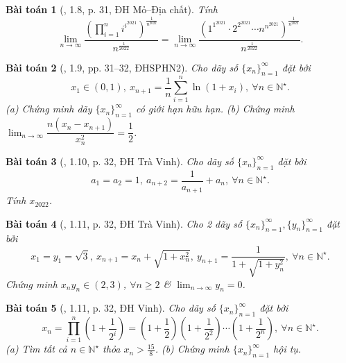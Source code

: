 \documentclass{article}
\newtheorem{baitoan}{Bài toán}
\begin{document}
\begin{baitoan}[\cite{VMS_VMC2023}, 1.8, p. 31, ĐH Mỏ--Địa chất]
	Tính
	\begin{equation*}
		\lim_{n\to\infty} \frac{\left(\prod_{i=1}^n i^{i^{2021}}\right)^{\frac{1}{n^{2022}}}}{n^{\frac{1}{2022}}} = \lim_{n\to\infty} \frac{\left(1^{1^{2021}}\cdot2^{2^{2021}}\cdots n^{n^{2021}}\right)^{\frac{1}{n^{2022}}}}{n^{\frac{1}{2022}}}.
	\end{equation*}
\end{baitoan}

\begin{baitoan}[\cite{VMS_VMC2023}, 1.9, pp. 31--32, ĐHSPHN2]
	Cho dãy số $\{x_n\}_{n=1}^\infty$ đặt bởi
	\begin{equation*}
		x_1\in(0,1),\ x_{n+1} = \frac{1}{n}\sum_{i=1}^n \ln(1 + x_i),\ \forall n\in\mathbb{N}^\star.
	\end{equation*}
	(a) Chứng minh dãy $\{x_n\}_{n=1}^\infty$ có giới hạn hữu hạn. (b) Chứng minh $\lim_{n\to\infty} \dfrac{n(x_n - x_{n+1})}{x_n^2} = \dfrac{1}{2}$.
\end{baitoan}

\begin{baitoan}[\cite{VMS_VMC2023}, 1.10, p. 32, ĐH Trà Vinh]
	Cho dãy số $\{x_n\}_{n=1}^\infty$ đặt bởi
	\begin{equation*}
		a_1 = a_2 = 1,\ a_{n+2} = \frac{1}{a_{n+1}} + a_n,\ \forall n\in\mathbb{N}^\star.
	\end{equation*}
	Tính $x_{2022}$.
\end{baitoan}

\begin{baitoan}[\cite{VMS_VMC2023}, 1.11, p. 32, ĐH Trà Vinh]
	Cho 2 dãy số $\{x_n\}_{n=1}^\infty,\{y_n\}_{n=1}^\infty$ đặt bởi
	\begin{equation*}
		x_1 = y_1 = \sqrt{3},\ x_{n+1} = x_n + \sqrt{1 + x_n^2},\ y_{n+1} = \frac{1}{1 + \sqrt{1 + y_n^2}},\ \forall n\in\mathbb{N}^\star.
	\end{equation*}
	Chứng minh $x_ny_n\in(2,3)$, $\forall n\ge2$ \& $\lim_{n\to\infty} y_n = 0$.
\end{baitoan}

\begin{baitoan}[\cite{VMS_VMC2023}, 1.11, p. 32, ĐH Vinh]
	Cho dãy số $\{x_n\}_{n=1}^\infty$ đặt bởi
	\begin{equation*}
		x_n = \prod_{i=1}^n \left(1 + \frac{1}{2^i}\right) = \left(1 + \frac{1}{2}\right)\left(1 + \frac{1}{2^2}\right)\cdots\left(1 + \frac{1}{2^n}\right),\ \forall n\in\mathbb{N}^\star.
	\end{equation*}
	(a) Tìm tất cả $n\in\mathbb{N}^\star$ thỏa $x_n > \frac{15}{8}$. (b) Chứng minh $\{x_n\}_{n=1}^\infty$ hội tụ.
\end{baitoan}
\end{document}

